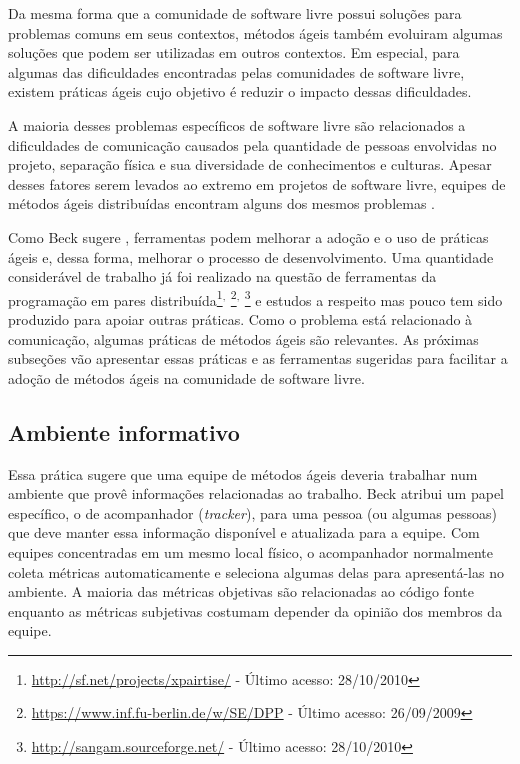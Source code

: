 Da mesma forma que a comunidade de software livre possui soluções para
problemas comuns em seus contextos, métodos ágeis também evoluiram
algumas soluções que podem ser utilizadas em outros contextos. Em
especial, para algumas das dificuldades encontradas pelas comunidades
de software livre, existem práticas ágeis cujo objetivo é reduzir o
impacto dessas dificuldades.

A maioria desses problemas específicos de software livre são
relacionados a dificuldades de comunicação causados pela quantidade de
pessoas envolvidas no projeto, separação física e sua diversidade de
conhecimentos e culturas. Apesar desses fatores serem levados ao
extremo em projetos de software livre, equipes de métodos ágeis
distribuídas encontram alguns dos mesmos problemas
\cite{Sutherland2007,Maurer2002}.

Como Beck sugere \cite{Beck2008}, ferramentas podem melhorar a adoção
e o uso de práticas ágeis e, dessa forma, melhorar o processo de
desenvolvimento. Uma quantidade considerável de trabalho já foi
realizado na questão de ferramentas da programação em pares
distribuída\footnote{\url{http://sf.net/projects/xpairtise/} - Último
  acesso: 28/10/2010}$^{,}$
\footnote{\url{https://www.inf.fu-berlin.de/w/SE/DPP} - Último acesso:
  26/09/2009}$^{,}$ \footnote{\url{http://sangam.sourceforge.net/} -
  Último acesso: 28/10/2010} e estudos a respeito \cite{Nagappan2003}
mas pouco tem sido produzido para apoiar outras práticas. Como o
problema está relacionado à comunicação, algumas práticas de métodos
ágeis são relevantes. As próximas subseções vão apresentar essas
práticas e as ferramentas sugeridas para facilitar a adoção de métodos
ágeis na comunidade de software livre.

\subsection{Ambiente informativo}
\label{subsec:inform-worksp}

Essa prática sugere que uma equipe de métodos ágeis deveria trabalhar
num ambiente que provê informações relacionadas ao trabalho. Beck
\cite{XP01} atribui um papel específico, o de acompanhador
(\emph{tracker}), para uma pessoa (ou algumas pessoas) que deve manter
essa informação disponível e atualizada para a equipe. Com equipes
concentradas em um mesmo local físico, o acompanhador normalmente
coleta métricas \cite{Sato2007} automaticamente e seleciona algumas
delas para apresentá-las no ambiente. A maioria das métricas objetivas
são relacionadas ao código fonte enquanto as métricas subjetivas
costumam depender da opinião dos membros da equipe.

